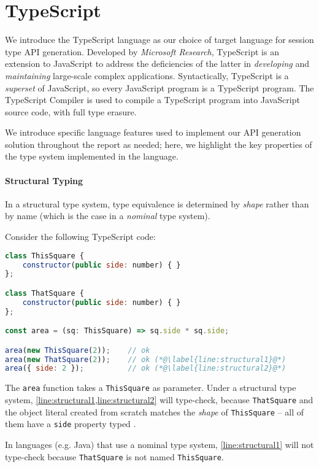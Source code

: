 \section{TypeScript}
\label{section:typescript}

We introduce the TypeScript language 
\cite{UnderstandingTypeScript}
as our choice of target language
for session type API generation.
Developed by \textit{Microsoft Research},
TypeScript is an extension to
JavaScript to address
the deficiencies of the latter in
\textit{developing} and \textit{maintaining}
large-scale complex applications.
Syntactically,
TypeScript is a \textit{superset} of JavaScript,
so every JavaScript program is a
TypeScript program.
The TypeScript Compiler is used
to compile a TypeScript program into JavaScript
source code, with full type erasure.

We introduce specific language
features used to implement our API generation
solution throughout the report as needed;
here, we highlight the key properties
of the type system implemented in the language.

\paragraph{Structural Typing}
In a structural type system, type equivalence
is determined by \textit{shape} rather than by name
(which is the case in a \textit{nominal} type system).

Consider the following TypeScript code:

\begin{lstlisting}[language=javascript]
class ThisSquare {
	constructor(public side: number) { }
};

class ThatSquare {
	constructor(public side: number) { }
};

const area = (sq: ThisSquare) => sq.side * sq.side;

area(new ThisSquare(2));	// ok
area(new ThatSquare(2));	// ok (*@\label{line:structural1}@*)
area({ side: 2 });			// ok (*@\label{line:structural2}@*)
\end{lstlisting}

The \texttt{area} function takes a \texttt{ThisSquare}
as parameter.
Under a structural type system,
\cref{line:structural1,line:structural2}
will type-check, because \texttt{ThatSquare} and the object
literal created from scratch matches the \textit{shape}
of \texttt{ThisSquare} -- all of them have a \texttt{side}
property typed .

In languages (e.g. Java) that use a nominal type system, 
\cref{line:structural1}
will not type-check because \texttt{ThatSquare} is not named
\texttt{ThisSquare}.

